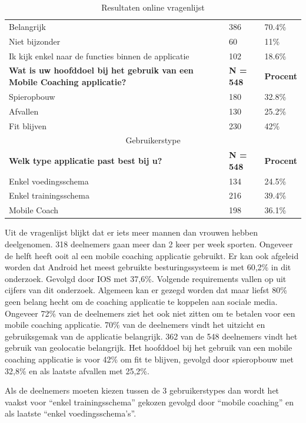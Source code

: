 \begin{table}[h!]
\begin{center}
\begin{tabular}{ |p{10cm}|p{2cm}|p{2cm}| }
 \hline
Belangrijk   & 386    &70.4\%   \\
Niet bijzonder & 60   &11\%   \\
Ik kijk enkel naar de functies binnen de applicatie &   102  &18.6\%   \\
 \hline
          \textbf{Wat is uw hoofddoel bij het gebruik van een Mobile Coaching applicatie?} & \textbf{N = 548} &\textbf{Procent}\\ 
 \hline
Spieropbouw  & 180    &32.8\%   \\
Afvallen & 130   &25.2\%   \\
Fit blijven &   230  &42\%   \\
  \hline
 \multicolumn{3}{|c|}{Gebruikerstype} \\
 \hline
         \textbf{Welk type applicatie past best bij u?} & \textbf{N = 548} &\textbf{Procent}\\ 
 \hline
 Enkel voedingsschema & 134    &24.5\%   \\
Enkel trainingsschema & 216  &39.4\%   \\
Mobile Coach &   198  &36.1\%   \\
  \hline
\end{tabular}
\end{center}
  \caption{Resultaten online vragenlijst}
\label{table:1}
\end{table}
\newpage
Uit de vragenlijst blijkt dat er iets meer mannen dan vrouwen hebben deelgenomen. 318 deelnemers gaan meer dan 2 keer per week sporten. Ongeveer de helft heeft ooit al een mobile coaching applicatie gebruikt. Er kan ook afgeleid worden dat Android het meest gebruikte besturingssysteem is met 60,2\% in dit onderzoek. Gevolgd door IOS met 37,6\%. 
Volgende requirements vallen op uit cijfers van dit onderzoek. Algemeen kan er gezegd worden dat maar liefst 80\% geen belang hecht om de coaching applicatie te koppelen aan sociale media. Ongeveer 72\% van de deelnemers ziet het ook niet zitten om te betalen voor een mobile coaching applicatie. 70\% van de deelnemers vindt het uitzicht en gebruiksgemak van de applicatie belangrijk. 362 van de 548 deelnemers vindt het gebruik van geolocatie belangrijk. Het hoofddoel bij het gebruik van een mobile coaching applicatie is voor 42\% om fit te blijven, gevolgd door spieropbouw met 32,8\% en als laatste afvallen met 25,2\%.

Als de deelnemers moeten kiezen tussen de 3 gebruikerstypes dan wordt het vaakst voor “enkel trainingsschema” gekozen gevolgd door “mobile coaching” en als laatste  “enkel voedingsschema’s”. 


